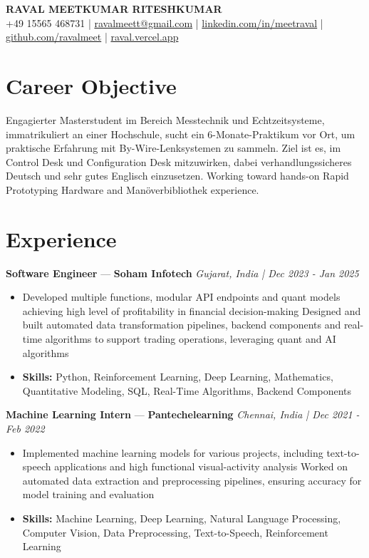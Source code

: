 \documentclass[a4paper,10pt]{article}
\begin{document}
\begin{center}
  {\Large\bfseries RAVAL MEETKUMAR RITESHKUMAR}\\[2pt]
  {\small +49 15565 468731 \;|\; \href{mailto:ravalmeett@gmail.com}{ravalmeett@gmail.com} \;|\; \href{https://www.linkedin.com/in/meetraval/}{linkedin.com/in/meetraval} \;|\; \href{https://github.com/ravalmeet}{github.com/ravalmeet} \;|\; \href{https://raval.vercel.app/}{raval.vercel.app}}
\end{center}
\vspace{-3pt}

\section*{Career Objective}
Engagierter Masterstudent im Bereich Messtechnik und Echtzeitsysteme, immatrikuliert an einer Hochschule, sucht ein 6-Monate-Praktikum vor Ort, um praktische Erfahrung mit By-Wire-Lenksystemen zu sammeln. Ziel ist es, im Control Desk und Configuration Desk mitzuwirken, dabei verhandlungssicheres Deutsch und sehr gutes Englisch einzusetzen. Working toward hands-on Rapid Prototyping Hardware and Manöverbibliothek experience.\par

\section*{Experience}
\textbf{Software Engineer} — \textbf{Soham Infotech} \hfill \textit{Gujarat, India \;|\; Dec 2023 - Jan 2025}\par
\vspace{1pt}
\begin{itemize}
  \item Developed multiple functions, modular API endpoints and quant models achieving high level of profitability in financial decision-making Designed and built automated data transformation pipelines, backend components and real-time algorithms to support trading operations, leveraging quant and AI algorithms
  \item \textbf{Skills:} Python, Reinforcement Learning, Deep Learning, Mathematics, Quantitative Modeling, SQL, Real-Time Algorithms, Backend Components
\end{itemize}
\vspace{3pt}
\textbf{Machine Learning Intern} — \textbf{Pantechelearning} \hfill \textit{Chennai, India \;|\; Dec 2021 - Feb 2022}\par
\vspace{1pt}
\begin{itemize}
  \item Implemented machine learning models for various projects, including text-to-speech applications and high functional visual-activity analysis Worked on automated data extraction and preprocessing pipelines, ensuring accuracy for model training and evaluation
  \item \textbf{Skills:} Machine Learning, Deep Learning, Natural Language Processing, Computer Vision, Data Preprocessing, Text-to-Speech, Reinforcement Learning
\end{itemize}
\end{document}
